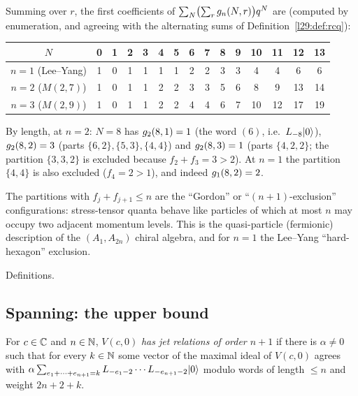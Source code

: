 \begin{example}[The counts for $n=1,2,3$]\label{l29:ex:gordon}
Summing over $r$, the first coefficients of $\sum_N\bigl(\sum_rg_n(N,r)\bigr)q^N$ are (computed by
enumeration, and agreeing with the alternating sums of Definition~\ref{l29:def:rcq}):
\begin{center}\small
\begin{tabular}{c|cccccccccccccc}
$N$ & 0&1&2&3&4&5&6&7&8&9&10&11&12&13\\ \hline
$n=1$ (Lee--Yang) & 1&0&1&1&1&1&2&2&3&3&4&4&6&6\\
$n=2$ ($M(2,7)$) & 1&0&1&1&2&2&3&3&5&6&8&9&13&14\\
$n=3$ ($M(2,9)$) & 1&0&1&1&2&2&4&4&6&7&10&12&17&19\\
\end{tabular}
\end{center}
By length, at $n=2$: $N=8$ has $g_2(8,1)=1$ (the word $(6)$, i.e.\ $L_{-8}|0\rangle$),
$g_2(8,2)=3$ (parts $\{6,2\},\{5,3\},\{4,4\}$) and $g_2(8,3)=1$ (parts $\{4,2,2\}$; the
partition $\{3,3,2\}$ is excluded because $f_2+f_3=3>2$). At $n=1$ the partition $\{4,4\}$ is also excluded
($f_4=2>1$), and indeed $g_1(8,2)=2$.
\end{example}

\begin{physics}
The partitions with $f_j+f_{j+1}\le n$ are the ``Gordon'' or ``$(n+1)$-exclusion'' configurations: stress-tensor
quanta behave like particles of which at most $n$ may occupy two adjacent momentum levels. This is the quasi-particle
(fermionic) description of the $(A_1,A_{2n})$ chiral algebra, and for $n=1$ the Lee--Yang ``hard-hexagon'' exclusion.
\end{physics}

\begin{status}
Definitions.
\end{status}

\subsection{Spanning: the upper bound}

\begin{definition}\label{l29:def:jetrel}
For $c\in{\mathbb{C}}$ and $n\in{\mathbb{N}}$, $V(c,0)$ \emph{has jet relations of order $n+1$} if there is $\alpha\ne0$ such that for every
$k\in{\mathbb{N}}$ some vector of the maximal ideal of $V(c,0)$ agrees with $\alpha\sum_{e_1+\cdots+e_{n+1}=k}
L_{-e_1-2}\cdots L_{-e_{n+1}-2}|0\rangle$ modulo words of length $\le n$ and weight $2n+2+k$.
\end{definition}

